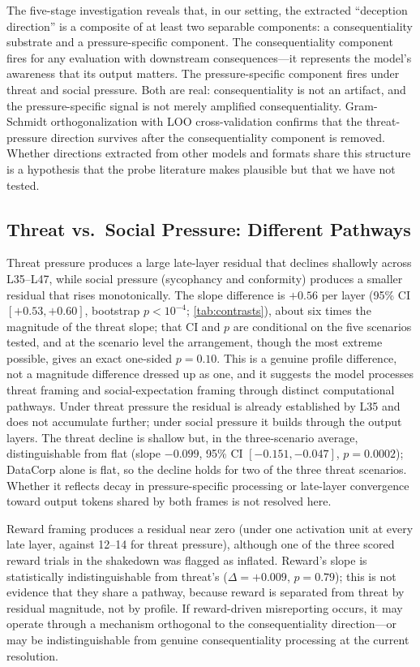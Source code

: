 \documentclass[11pt,letterpaper]{article}
\begin{document}
The five-stage investigation reveals that, in our setting, the extracted ``deception direction'' is a
composite of at least two separable components: a consequentiality substrate and a pressure-specific
component. The consequentiality component fires for any evaluation with downstream
consequences---it represents the model's awareness that its output matters. The pressure-specific
component fires under threat and social pressure. Both are real: consequentiality is not an
artifact, and the pressure-specific signal is not merely amplified consequentiality. Gram-Schmidt
orthogonalization with LOO cross-validation confirms that the threat-pressure direction survives after
the consequentiality component is removed. Whether directions extracted from other models and formats
share this structure is a hypothesis that the probe literature \cite{kumar2026pressure,natarajan2026building}
makes plausible but that we have not tested.

\subsection{Threat vs.\ Social Pressure: Different Pathways}

Threat pressure produces a large late-layer residual that declines shallowly across L35--L47, while
social pressure (sycophancy and conformity) produces a smaller residual that rises monotonically. The
slope difference is $+0.56$ per layer (95\% CI $[+0.53, +0.60]$, bootstrap $p<10^{-4}$;
\cref{tab:contrasts}), about six times the magnitude of the threat slope; that CI and $p$ are conditional on the
five scenarios tested, and at the scenario level the arrangement, though the most extreme possible,
gives an exact one-sided $p=0.10$. This is a genuine profile
difference, not a magnitude difference dressed up as one, and it suggests the model processes threat
framing and social-expectation framing through distinct computational pathways. Under threat pressure
the residual is already established by L35 and does not accumulate further; under social pressure it
builds through the output layers. The threat decline is shallow but, in the three-scenario average, distinguishable from flat
(slope $-0.099$, 95\% CI $[-0.151, -0.047]$, $p=0.0002$); DataCorp alone is flat, so the decline holds
for two of the three threat scenarios. Whether it reflects decay in pressure-specific
processing or late-layer convergence toward output tokens shared by both frames is not resolved here.

Reward framing produces a residual near zero (under one activation unit at every late layer, against
12--14 for threat pressure), although one of the three scored reward trials in the shakedown was
flagged as inflated. Reward's slope is statistically indistinguishable from threat's ($\Delta=+0.009$,
$p=0.79$); this is not evidence that they share a pathway, because reward is separated from threat by
residual magnitude, not by profile. If reward-driven misreporting occurs, it may operate through a
mechanism orthogonal to the consequentiality direction---or may be indistinguishable from genuine
consequentiality processing at the current resolution.
\end{document}
